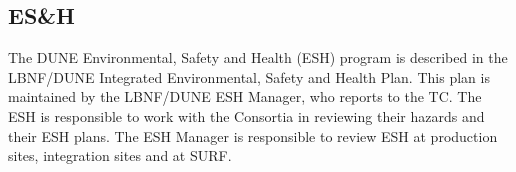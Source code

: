 \subsection{ES\&H}
\label{sec:fdsp-coord-esh}

The DUNE Environmental, Safety and Health (ESH) program is described
in the LBNF/DUNE Integrated Environmental, Safety and Health
Plan. This plan is maintained by the LBNF/DUNE ESH Manager, who
reports to the TC. The ESH is responsible to work with the Consortia
in reviewing their hazards and their ESH plans.  The ESH Manager is
responsible to review ESH at production sites, integration sites and
at SURF.



